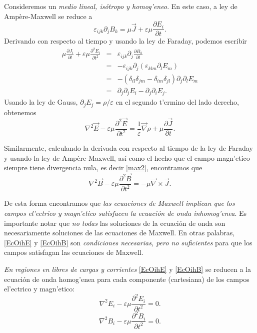 Consideremos un \textit{medio lineal, isótropo y homog'eneo}. En este caso, a ley de Amp\`ere-Maxwell se reduce a
\begin{equation}
\varepsilon_{ijk}\partial_jB_k=\mu\vec{J}+\varepsilon\mu\frac{\partial E_i}{\partial t}.
\end{equation}
Derivando con respecto al tiempo y usando la ley de Faraday, podemos escribir
\begin{eqnarray}
\mu \frac{\partial J_i}{\partial t}+\varepsilon\mu\frac{\partial^2E_i}{\partial t^2}
&=&\varepsilon_{ijk}\partial_j\frac {\partial B_k}{\partial t} \\
&=&-\varepsilon_{ijk}\partial_j\left(\varepsilon_{klm}\partial_lE_m \right)\\
&=&-\left( \delta_{il}\delta_{jm}-\delta_{im}\delta_{jl}\right)
\partial_j\partial_lE_m\\
&=&\partial_j\partial_jE_i-\partial_j\partial_iE_j.
\end{eqnarray}
Usando la ley de Gauss, $\partial_jE_j=\rho/\varepsilon$ en el segundo t'ermino del lado derecho, obtenemos
\begin{equation}\label{EcOihE}
\boxed{\nabla^2\vec{E}-\varepsilon\mu\frac{\partial^2\vec{E}}{\partial t^2}=\frac{1}{\varepsilon}\vec\nabla\rho+\mu\frac{\partial\vec{J}}{\partial t}.}
\end{equation}

Similarmente, calculando la derivada con respecto al tiempo de la ley de Faraday y usando la ley de Amp\`ere-Maxwell, así como el hecho que el campo magn'etico siempre tiene divergencia nula, es decir \eqref{max2}, encontramos que
\begin{equation}\label{EcOihB}
\boxed{\nabla^2\vec{B}-\varepsilon\mu\frac{\partial^2\vec{B}}{\partial t^2}=-\mu\vec\nabla\times\vec{J}.}
\end{equation}

De esta forma encontramos que \textit{las ecuaciones de Maxwell implican que los
campos el'ectrico y magn'etico satisfacen la ecuación de onda inhomog'enea}. Es importante notar que \textit{no todas} las soluciones de la ecuación de onda son necesariamente soluciones de las ecuaciones de Maxwell. En otras palabras, \eqref{EcOihE} y \eqref{EcOihB} son \textit{condiciones necesarias, pero no suficientes} para que los campos satisfagan las ecuaciones de Maxwell.

\textit{En regiones en libres de cargas y corrientes} \eqref{EcOihE} y \eqref{EcOihB} se reducen a la ecuación de onda homog'enea para cada componente (cartesiana) de los campos el'ectrico y magn'etico:
\begin{equation}\label{econdaE}
\boxed{\nabla^2E_i-\varepsilon\mu\frac{\partial^2E_i}{\partial t^2}=0.}
\end{equation}
\begin{equation}
\boxed{\nabla^2B_i-\varepsilon\mu\frac{\partial^2B_i}{\partial t^2}=0.}
\label{econdaB}
\end{equation}



